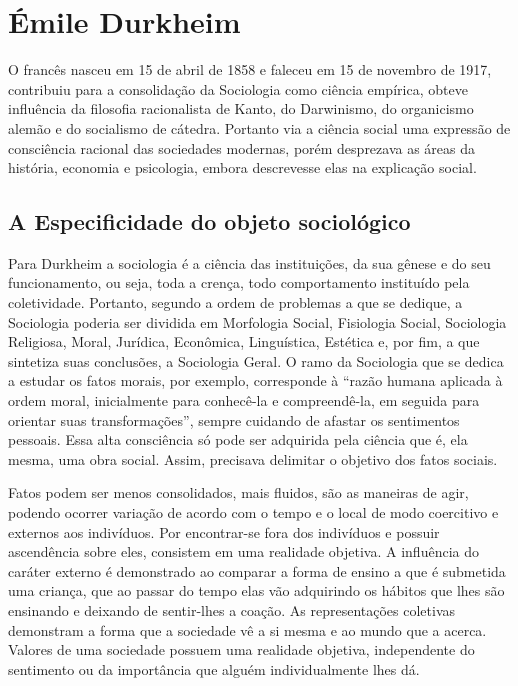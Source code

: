 \newpage
\section{Émile Durkheim}\label{durkheim}

O francês nasceu em 15 de abril de 1858 e faleceu em 15 de novembro de 1917, contribuiu para a consolidação da Sociologia como ciência empírica, obteve influência da filosofia racionalista de Kanto, do Darwinismo, do organicismo alemão e do socialismo de cátedra.
Portanto via a ciência social uma expressão de consciência racional das sociedades modernas, porém desprezava as áreas da história, economia e psicologia, embora descrevesse elas na explicação social.


\subsection{A Especificidade do objeto sociológico}

Para Durkheim a sociologia é a ciência das instituições, da sua gênese e do seu funcionamento, ou seja, toda a crença, todo comportamento instituído pela coletividade. 
Portanto, segundo a ordem de problemas a que se dedique, a Sociologia poderia ser dividida em Morfologia Social, Fisiologia Social, Sociologia Religiosa, Moral, Jurídica, Econômica, Linguística, Estética e, por fim, a que sintetiza suas conclusões, a Sociologia Geral. 
O ramo da Sociologia que se dedica a estudar os fatos morais, por exemplo, corresponde à “razão humana aplicada à ordem moral, inicialmente para conhecê-la e compreendê-la, em seguida para orientar suas transformações”, sempre cuidando de afastar os sentimentos pessoais. 
Essa alta consciência só pode ser adquirida pela ciência que é, ela mesma, uma obra social.
Assim, precisava delimitar o objetivo dos fatos sociais.

Fatos podem ser menos consolidados, mais fluidos, são as maneiras de agir, podendo ocorrer variação de acordo com o tempo e o local de modo coercitivo e externos aos indivíduos.
Por encontrar-se fora dos indivíduos e possuir ascendência sobre eles, consistem em uma realidade objetiva.
A influência do caráter externo é demonstrado ao comparar a forma de ensino a que é submetida uma criança, que ao passar do tempo elas vão adquirindo os hábitos que lhes são ensinando e deixando de sentir-lhes a coação. 
As representações coletivas demonstram a forma que a sociedade vê a si mesma e ao mundo que a acerca.
Valores de uma sociedade possuem uma realidade objetiva, independente do sentimento ou da importância que alguém individualmente lhes dá.


